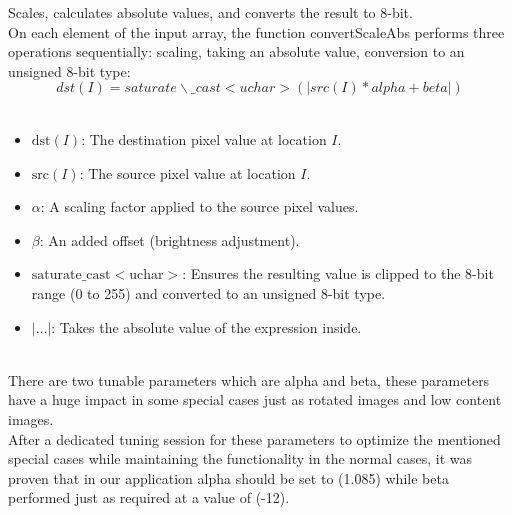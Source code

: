 \quad Scales, calculates absolute values, and converts the result to 8-bit.\\

\quad On each element of the input array, the function convertScaleAbs
performs three operations sequentially: scaling, taking an absolute
value, conversion to an unsigned 8-bit type:\\

\[dst(I) = saturate\backslash\text{\_}cast < uchar > (\left| src(I)*alpha + beta \right|)\]\\
\begin{itemize}
    \item \(\text{dst}(I)\): The destination pixel value at location \( I \).
    \item \(\text{src}(I)\): The source pixel value at location \( I \).
    \item \(\alpha\): A scaling factor applied to the source pixel values.
    \item \(\beta\): An added offset (brightness adjustment).
    \item \(\text{saturate\_cast}<\text{uchar}>\): Ensures the resulting value is clipped to the 8-bit range (0 to 255) and converted to an unsigned 8-bit type.
    \item \(| \ldots |\): Takes the absolute value of the expression inside.
\end{itemize}\\

\quad There are two tunable parameters which are alpha and beta, these
parameters have a huge impact in some special cases just as rotated
images and low content images.\\

\quad After a dedicated tuning session for these parameters to optimize the
mentioned special cases while maintaining the functionality in the
normal cases, it was proven that in our application alpha should be set
to (1.085) while beta performed just as required at a value of (-12).\\

